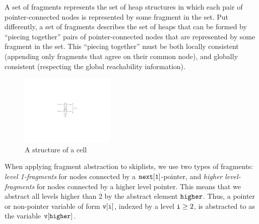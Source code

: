 A set of fragments represents the set of heap
structures in which each pair of pointer-connected nodes is represented by some
fragment in the set.
Put differently, a set of fragments describes the set of heaps that can be formed by
``piecing together'' pairs of pointer-connected nodes that are represented
by some fragment in the set. This ``piecing together'' must
be both locally consistent (appending only fragments that agree on their
common node), and globally consistent (respecting the global reachability
information).
\begin{figure} 
\vspace{-30pt}
  \begin{center}
 \includegraphics[width=0.4\textwidth, trim={13cm 10cm 12cm 9cm}, clip]{skipcell.pdf}  
    \caption{A structure of a cell}
    \label{skipcell}
  \end{center}
  \vspace{-40pt}
  \vspace{1pt}
\end{figure}
When applying fragment abstraction to skiplists, we  use two types of fragments:
{\em level 1-fragments} for
nodes connected by a $\tt next[1]$-pointer, and {\em higher level-fragments} for
nodes connected by a higher level pointer. This means that we abstract all levels
higher than 2 by the abstract element $\tt higher$. Thus, a pointer or
non-pointer variable of form $\tt v[i]$, indexed by a level ${\tt i} \geq 2$, is
abstracted to as the variable $\tt v[higher]$.

